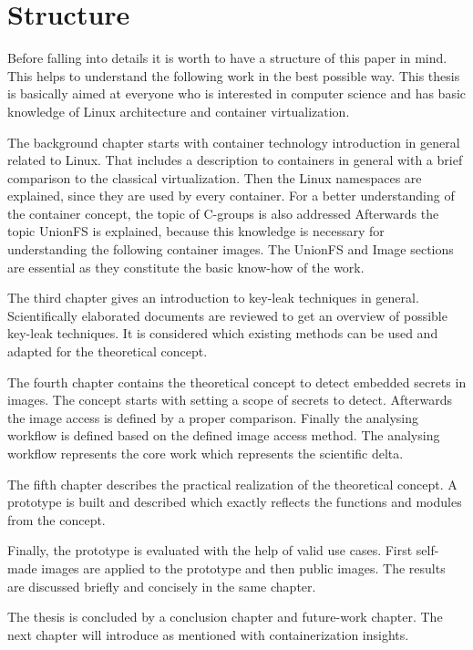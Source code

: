 %
%
\section{Structure}
\label{sec:intro:structure}
Before falling into details it is worth to have a structure of this paper in mind. This helps to understand the following work in the best possible way. This thesis is basically aimed at everyone who is interested in computer science and has basic knowledge of Linux architecture and container virtualization.

The background chapter starts with container technology introduction in general related to Linux. 
That includes a description to containers in general with a brief comparison to the classical virtualization. Then the Linux namespaces are explained, since they are used by every container. 
For a better understanding of the container concept, the topic of C-groups is also addressed
Afterwards the topic UnionFS is explained, because this knowledge is necessary for understanding the following container images.
The UnionFS and Image sections are essential as they constitute the basic know-how of the work.

The third chapter gives an introduction to key-leak techniques in general.
Scientifically elaborated documents are reviewed to get an overview of possible key-leak techniques.
It is considered which existing methods can be used and adapted for the theoretical concept.

The fourth chapter contains the theoretical concept to detect embedded secrets in images. The concept starts with setting a scope of secrets to detect. Afterwards the image access is defined by a proper comparison.
Finally the analysing workflow is defined based on the defined image access method.
The analysing workflow represents the core work which represents the scientific delta.

The fifth chapter describes the practical realization of the theoretical concept. A prototype is built and described which exactly reflects the functions and modules from the concept. 

Finally, the prototype is evaluated with the help of valid use cases. First self-made images are applied to the prototype and then public images. The results are discussed briefly and concisely in the same chapter.

The thesis is concluded by a conclusion chapter and future-work chapter.	
The next chapter will introduce as mentioned with containerization insights.

